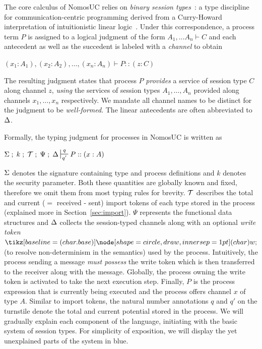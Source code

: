 
The core calculus of NomosUC relies on \emph{binary session types}~\cite{caires2010session}:
a type discipline for communication-centric programming derived from a Curry-Howard interpretation
of intuitionistic linear logic~\cite{girard1987linear}.
Under this correspondence, a process term $P$ is assigned to
a logical judgment of the form $A_1, \ldots A_n \vdash C$ and each antecedent as well as the succedent is
labeled with a \emph{channel} to obtain
\begin{center}
\begin{minipage}{0cm}
\begin{tabbing}
$(x_1 : A_1), (x_2 : A_2), \ldots, (x_n : A_n) \vdash P :: (z : C)$
\end{tabbing}
\end{minipage}
\end{center}

The resulting judgment states that process $P$ \emph{provides} a service
of session type $C$ along channel $z$, \emph{using} the services of session
types $A_1, \ldots, A_n$ provided along channels $x_1, \ldots, x_n$ respectively.
We mandate all channel names to be distinct for the judgment
to be \emph{well-formed}.
The linear antecedents are often abbreviated to $\Delta$.

Formally, the typing judgment for processes in NomosUC is written as
\begin{center}
\begin{minipage}{0cm}
\begin{tabbing}
$\Sg \semi k \semi \Tokens \semi \Psi \semi \D \entailpot{q}{q'} P :: (x : A)$
\end{tabbing}
\end{minipage}
\end{center}

$\Sigma$ denotes the signature containing type and process definitions and $k$
denotes the security parameter.
Both these quantities are globally known and fixed, therefore we omit them from
most typing rules for brevity.
$\mathcal{T}$ describes the total and current ($=$ received - sent) import tokens
of each type stored in the process (explained more in Section~\ref{sec:import}).
$\Psi$ represents the functional data structures and $\Delta$ collects the
session-typed channels along with an optional \emph{write token} $\wt$
(to resolve non-determinism in the semantics) used by the process.
Intuitively, the process sending a message \emph{must possess} the write
token which is then transferred to the receiver along with the message.
Globally, the process owning the write token is activated to take the
next execution step.
Finally, $P$ is the process expression that is currently being executed and
the process offers channel $x$ of type $A$.
Similar to import tokens, the natural number annotations $q$ and $q'$ on the turnstile
denote the total and current potential stored in the process.
We will gradually explain each component of the language, initiating
with the basic system of session types.
For simplicity of exposition, we will display the yet unexplained
parts of the system in blue.

